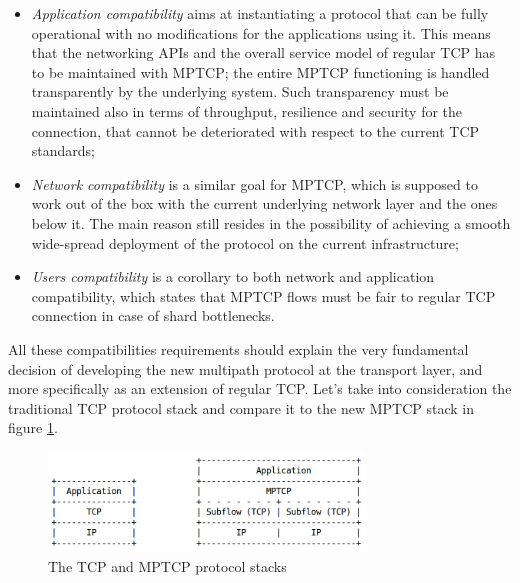 \begin{itemize}
  \item \textit{Application compatibility} aims at instantiating a protocol that can be fully operational with no modifications for the applications using it. This means that the networking APIs and the overall service model of regular TCP has to be maintained with MPTCP; the entire MPTCP functioning is handled transparently by the underlying system. Such transparency must be maintained also in terms of throughput, resilience and security for the connection, that cannot be deteriorated with respect to the current TCP standards;
  \item \textit{Network compatibility} is a similar goal for MPTCP, which is supposed to work out of the box with the current underlying network layer and the ones below it. The main reason still resides in the possibility of achieving a smooth wide-spread deployment of the protocol on the current infrastructure;
  \item \textit{Users compatibility} is a corollary to both network and application compatibility, which states that MPTCP flows must be fair to regular TCP connection in case of shard bottlenecks.
\end{itemize}


All these compatibilities requirements should explain the very fundamental decision of developing the new multipath protocol at the transport layer, and more specifically as an extension of regular TCP. Let's take into consideration the traditional TCP protocol stack and compare it to the new MPTCP stack in figure \ref{fig:stack}.

\begin{figure}[!htb]
\centering
\includegraphics[width=0.75\textwidth]{images/stack}
\caption{The TCP and MPTCP protocol stacks}
\label{fig:stack}
\end{figure}

